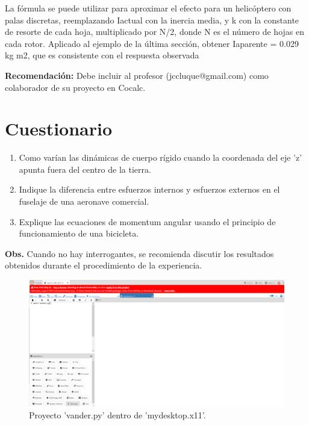 \documentclass[12pt,oneside,spanish]{article}
\begin{document}
\begin{enumerate}
La fórmula se puede utilizar para aproximar el efecto para un helicóptero con palas discretas, reemplazando Iactual con la inercia media, y k con la constante de resorte de cada hoja, multiplicado por N/2, donde N es el número de hojas en cada rotor. Aplicado al ejemplo de la última sección,
obtener Iaparente = 0.029 kg m2, que es consistente con el respuesta observada

\end{enumerate}

\textbf{Recomendación:} Debe incluir al profesor (jccluque@gmail.com) como colaborador de su proyecto en Cocalc.
\section{Cuestionario}
\begin{enumerate}
    \item Como varían las dinámicas de cuerpo rígido cuando la coordenada del eje 'z' apunta fuera del centro de la tierra.
    \item Indique la diferencia entre esfuerzos internos y esfuerzos externos en el fuselaje de una aeronave comercial.
    \item Explique las ecuaciones de momentum angular usando el principio de funcionamiento de una bicicleta. 
\end{enumerate}
\textbf{Obs.} Cuando no hay interrogantes, se recomienda discutir los resultados obtenidos durante el procedimiento de la experiencia.

\begin{figure}
    \centering
    \includegraphics[width=12cm]{vander.png}
    \caption{Proyecto 'vander.py' dentro de 'mydesktop.x11'.}
    \label{fig:vander}
\end{figure}
\end{document}
